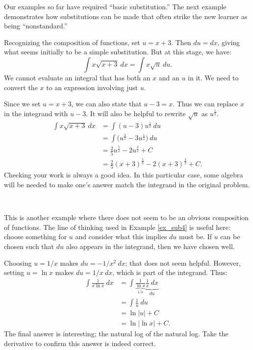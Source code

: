 Our examples so far have required ``basic substitution.'' The next example demonstrates how substitutions can be made that often strike the new learner as being ``nonstandard.''\\


{Recognizing the composition of functions, set $u = x+3$. Then $du = dx$, giving what seems initially to be a simple substitution. But at this stage, we have:
	$$\int x\sqrt{x+3}\ dx = \int x\sqrt{u}\ du.$$
We cannot evaluate an integral that has both an $x$ and an $u$ in it. We need to convert the $x$ to an expression involving just $u$.

Since we set $u = x+3$, we can also state that $u-3 = x$. Thus we can replace $x$ in the integrand with $u-3$. It will also be helpful to rewrite $\sqrt{u}$ as $u^\frac12$.
\begin{align*}
		\int x\sqrt{x+3} \ dx &= \int (u-3)u^\frac12\ du \\
											&= \int \big(u^\frac32 - 3u^\frac12\big) \ du \\
											&= \frac25u^\frac52 - 2u^\frac32 + C \\
											&= \frac25(x+3)^\frac52 - 2(x+3)^\frac32 + C.
\end{align*}
Checking your work is always a good idea. In this particular case, some algebra will be needed to make one's answer match the integrand in the original problem.
}\\

{This is another example where there does not seem to be an obvious composition of functions. The line of thinking used in Example \ref{ex_sub4} is useful here: choose something for $u$ and consider what this implies $du$ must be. If $u$ can be chosen such that $du$ also appears in the integrand, then we have chosen well.

Choosing $u = 1/x$ makes $du = -1/x^2\ dx$; that does not seem helpful. However, setting $u = \ln x$ makes $du = 1/x\ dx$, which is part of the integrand. Thus:
\begin{align*}
	\int \frac1{x\ln x}\ dx 	&=	\int \frac{1}{\underbrace{\ln x}_{1/u}}\underbrace{\frac1x\ dx}_{du} \\
												&= \int \frac1u\ du \\
												&= \ln |u| + C \\
												&= \ln | \ln x| + C.
\end{align*}
The final answer is interesting; the natural log of the natural log. Take the derivative to confirm this answer is indeed correct.
}\\


